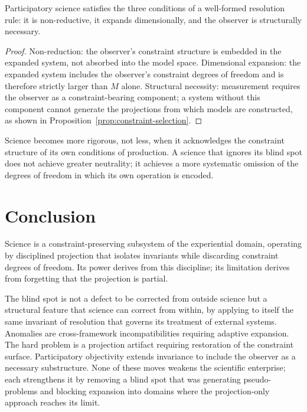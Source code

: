 \documentclass[11pt,openany]{book}
\begin{document}
\begin{proposition}
\label{prop:participatory}
Participatory science satisfies the three conditions of a
well-formed resolution rule: it is non-reductive, it
expands dimensionally, and the observer is structurally
necessary.
\end{proposition}

\begin{proof}
Non-reduction: the observer's constraint structure is
embedded in the expanded system, not absorbed into the
model space.  Dimensional expansion: the expanded system
includes the observer's constraint degrees of freedom and
is therefore strictly larger than $M$ alone.  Structural
necessity: measurement requires the observer as a
constraint-bearing component; a system without this
component cannot generate the projections from which models
are constructed, as shown in
Proposition~\ref{prop:constraint-selection}.
\end{proof}

Science becomes more rigorous, not less, when it
acknowledges the constraint structure of its own conditions
of production.  A science that ignores its blind spot does
not achieve greater neutrality; it achieves a more
systematic omission of the degrees of freedom in which its
own operation is encoded.

\section{Conclusion}
\label{sec:conclusion-science}

Science is a constraint-preserving subsystem of the
experiential domain, operating by disciplined projection
that isolates invariants while discarding constraint
degrees of freedom.  Its power derives from this
discipline; its limitation derives from forgetting that the
projection is partial.

The blind spot is not a defect to be corrected from outside
science but a structural feature that science can correct
from within, by applying to itself the same invariant of
resolution that governs its treatment of external systems.
Anomalies are cross-framework incompatibilities requiring
adaptive expansion.  The hard problem is a projection
artifact requiring restoration of the constraint surface.
Participatory objectivity extends invariance to include the
observer as a necessary substructure.  None of these moves
weakens the scientific enterprise; each strengthens it by
removing a blind spot that was generating pseudo-problems
and blocking expansion into domains where the
projection-only approach reaches its limit.
\end{document}
